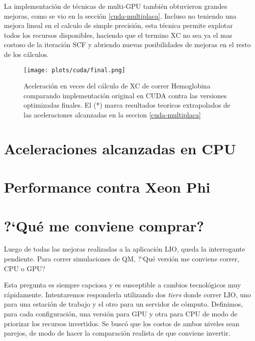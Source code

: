 La implementaci\'on de t\'ecnicas de multi-GPU tambi\'en obtuvieron grandes mejoras, como se vio en la
secci\'on \ref{cuda-multiplaca}. Incluso no teniendo una mejora lineal en el calculo de simple
precisi\'on, esta t\'ecnica permite explotar todos los recursos disponibles, haciendo que el termino
XC no sea ya el mas costoso de la iteraci\'on SCF y abriendo nuevas posibilidades de mejoras en el
resto de los c\'alculos.

\begin{figure}[htbp]
   \centering
   \texttt{[image: plots/cuda/final.png]}
   \caption{Aceleraci\'on en veces del c\'alculo de XC de correr Hemoglobina comparando implementaci\'on original en CUDA contra
   las versiones optimizadas finales. El (*) marca resultados teoricos extrapolados de las
 aceleraciones alcanzadas en la seccion \ref{cuda-multiplaca}}
   \label{fig:cuda-final}
\end{figure}


\section{Aceleraciones alcanzadas en CPU}

\section{Performance contra Xeon Phi}

\section{?`Qu\'e me conviene comprar?}
Luego de todas las mejoras realizadas a la aplicaci\'on LIO, queda la interrogante pendiente. Para
correr simulaciones de QM, ?`Qu\'e versi\'on me conviene correr, CPU o GPU?

Esta pregunta es siempre capciosa y es susceptible a cambios tecnol\'ogicos muy r\'apidamente. Intentaremos
responderla utilizando dos \textit{tiers} donde correr LIO, uno para una estaci\'on de trabajo
y el otro para un servidor de c\'omputo. Definimos, para cada configuraci\'on, una versi\'on para GPU y otra
para CPU de modo de priorizar los recursos invertidos. Se busc\'o que los costos de ambos niveles
sean parejos, de modo de hacer la comparaci\'on realista de que conviene invertir.

